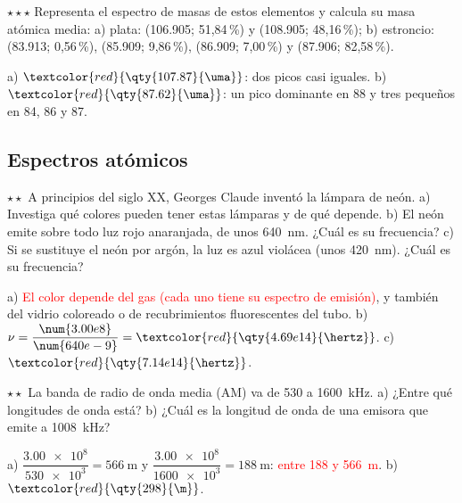 \begin{exercise}
    \(\star\star\star\) Representa el espectro de masas de estos elementos y calcula su masa atómica media: a) plata:
     (\qty{106.905}{\uma}; 51,84\,\%) y  (\qty{108.905}{\uma}; 48,16\,\%); b) estroncio: 
    (\qty{83.913}{\uma}; 0,56\,\%),  (\qty{85.909}{\uma}; 9,86\,\%),  (\qty{86.909}{\uma}; 7,00\,\%) y
     (\qty{87.906}{\uma}; 82,58\,\%).
    \begin{solu}
        a) \(\textcolor{red}{\qty{107.87}{\uma}}\): dos picos casi iguales. b) \(\textcolor{red}{\qty{87.62}{\uma}}\): un pico
        dominante en 88 y tres pequeños en 84, 86 y 87.
    \end{solu}
\end{exercise}

\subsection{Espectros atómicos}

\begin{exercise}
    \(\star\star\) A principios del siglo XX, Georges Claude inventó la lámpara de neón. a) Investiga qué colores pueden tener
    estas lámparas y de qué depende. b) El neón emite sobre todo luz rojo anaranjada, de unos \qty{640}{\nm}. ¿Cuál es su
    frecuencia? c) Si se sustituye el neón por argón, la luz es azul violácea (unos \qty{420}{\nm}). ¿Cuál es su frecuencia?
    \begin{solu}
        a) \textcolor{red}{El color depende del gas (cada uno tiene su espectro de emisión)}, y también del vidrio coloreado o de
        recubrimientos fluorescentes del tubo. b) \(\nu = \dfrac{\num{3.00e8}}{\num{640e-9}} = \textcolor{red}{\qty{4.69e14}{\hertz}}\).
        c) \(\textcolor{red}{\qty{7.14e14}{\hertz}}\).
    \end{solu}
\end{exercise}

\begin{exercise}
    \(\star\star\) La banda de radio de onda media (AM) va de 530 a \qty{1600}{\kilo\hertz}. a) ¿Entre qué longitudes de onda está?
    b) ¿Cuál es la longitud de onda de una emisora que emite a \qty{1008}{\kilo\hertz}?
    \begin{solu}
        a) \(\dfrac{\num{3.00e8}}{\num{530e3}} = \qty{566}{\m}\) y \(\dfrac{\num{3.00e8}}{\num{1600e3}} = \qty{188}{\m}\):
        \textcolor{red}{entre 188 y \qty{566}{\m}}. b) \(\textcolor{red}{\qty{298}{\m}}\).
    \end{solu}
\end{exercise}

